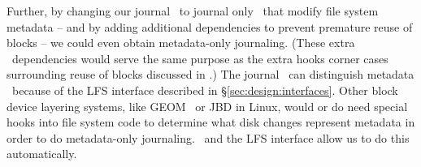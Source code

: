 Further, by changing our journal \module\ to journal only \chdescs\ that modify
file system metadata -- and by adding additional dependencies to prevent
premature reuse of blocks -- we could even obtain metadata-only journaling.
(These extra \chdesc\ dependencies would serve the same purpose as the extra
hooks corner cases surrounding reuse of blocks discussed in
\cite{tweedie00ext3}.) The journal \module\ can distinguish metadata \chdescs\
because of the LFS interface described in \S\ref{sec:design:interfaces}. Other
block device layering systems, like GEOM~\cite{geom} or JBD in Linux, would or
do need special hooks into file system code to determine what disk changes
represent metadata in order to do metadata-only journaling. \Chdescs\ and the
LFS interface allow us to do this automatically.
